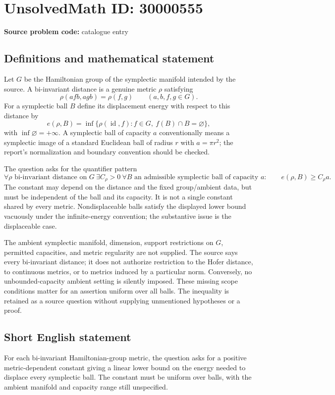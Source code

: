 \documentclass[11pt]{article}
\begin{document}
\section*{UnsolvedMath ID: 30000555}
\textbf{Source problem code:} catalogue entry
\subsection{Definitions and mathematical statement}
Let $G$ be the Hamiltonian group of the symplectic manifold intended by the source. A bi-invariant distance is a genuine metric $\rho$ satisfying
\[
 \rho(afb,agb)=\rho(f,g)\qquad(a,b,f,g\in G).
\]
For a symplectic ball $B$ define its displacement energy with respect to this distance by
\[
 e(\rho,B)=\inf\{\rho(\operatorname{id},f):f\in G,
                                      \ f(B)\cap B=\varnothing\},
\]
with $\inf\varnothing=+\infty$. A symplectic ball of capacity $a$ conventionally means a symplectic image of a standard Euclidean ball of radius $r$ with $a=\pi r^2$; the report's normalization and boundary convention should be checked.

The question asks for the quantifier pattern
\[
 \forall\rho\text{ bi-invariant distance on }G\ \exists C_\rho>0
 \ \forall B\text{ an admissible symplectic ball of capacity }a:
 \qquad e(\rho,B)\ge C_\rho a.
\]
The constant may depend on the distance and the fixed group/ambient data, but must be independent of the ball and its capacity. It is not a single constant shared by every metric. Nondisplaceable balls satisfy the displayed lower bound vacuously under the infinite-energy convention; the substantive issue is the displaceable case.

The ambient symplectic manifold, dimension, support restrictions on $G$, permitted capacities, and metric regularity are not supplied. The source says every bi-invariant distance; it does not authorize restriction to the Hofer distance, to continuous metrics, or to metrics induced by a particular norm. Conversely, no unbounded-capacity ambient setting is silently imposed. These missing scope conditions matter for an assertion uniform over all balls. The inequality is retained as a source question without supplying unmentioned hypotheses or a proof.
\subsection{Short English statement}
For each bi-invariant Hamiltonian-group metric, the question asks for a positive metric-dependent constant giving a linear lower bound on the energy needed to displace every symplectic ball. The constant must be uniform over balls, with the ambient manifold and capacity range still unspecified.
\end{document}
